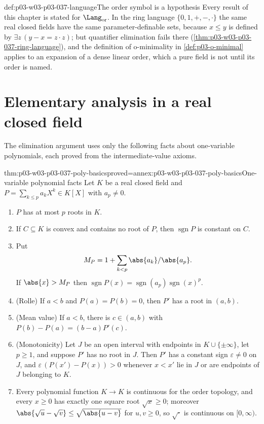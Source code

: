 \begin{hbwarning}{def:p03-w03-p03-037-language}{The order symbol is a hypothesis}
Every result of this chapter is stated for \(\Lang_{\mathrm{or}}\).  In the
ring language \(\{0,1,+,-,\mathbin{\cdot}\}\) the same real closed fields
have the same parameter-definable sets, because \(x\leq y\) is defined by
\(\exists z\,(y-x=z\mathbin{\cdot}z)\); but quantifier elimination fails there
(\cref{thm:p03-w03-p03-037-ring-language}), and the definition of
o-minimality in \cref{def:p03-o-minimal} applies to an expansion of a dense
linear order, which a pure field is not until its order is named.
\end{hbwarning}

\section{Elementary analysis in a real closed field}
\label{sec:p03-w03-p03-037-analysis}

The elimination argument uses only the following facts about one-variable
polynomials, each proved from the intermediate-value axioms.

\begin{hblemma}{thm:p03-w03-p03-037-poly-basics}{proved=annex:p03-w03-p03-037-poly-basics}{One-variable polynomial facts}
Let \(K\) be a real closed field and \(P=\sum_{k\leq p}a_kX^k\in K[X]\) with
\(a_p\neq0\).
\begin{enumerate}
\item \(P\) has at most \(p\) roots in \(K\).
\item If \(C\subseteq K\) is convex and contains no root of \(P\), then
  \(\operatorname{sgn}P\) is constant on \(C\).
\item Put
  \[M_P=1+\sum_{k<p}\abs{a_k}/\abs{a_p}.\]
  If \(\abs{x}>M_P\) then
  \(\operatorname{sgn}P(x)=\operatorname{sgn}(a_p)\operatorname{sgn}(x)^p\).
\item (Rolle) If \(a<b\) and \(P(a)=P(b)=0\), then \(P'\) has a root in
  \((a,b)\).
\item (Mean value) If \(a<b\), there is \(c\in(a,b)\) with
  \(P(b)-P(a)=(b-a)P'(c)\).
\item (Monotonicity) Let \(J\) be an open interval with endpoints in
  \(K\cup\{\pm\infty\}\), let \(p\geq1\), and suppose \(P'\) has no root in
  \(J\).  Then \(P'\) has a constant sign \(\varepsilon\neq0\) on \(J\), and
  \(\varepsilon\,(P(x')-P(x))>0\) whenever \(x<x'\) lie in \(J\) or are
  endpoints of \(J\) belonging to \(K\).
\item Every polynomial function \(K\to K\) is continuous for the order
  topology, and every \(x\geq0\) has exactly one square root
  \(\sqrt{x}\geq0\); moreover \(\abs{\sqrt u-\sqrt v}\leq\sqrt{\abs{u-v}}\)
  for \(u,v\geq0\), so \(\sqrt{\cdot}\) is continuous on \([0,\infty)\).
\end{enumerate}
\end{hblemma}

